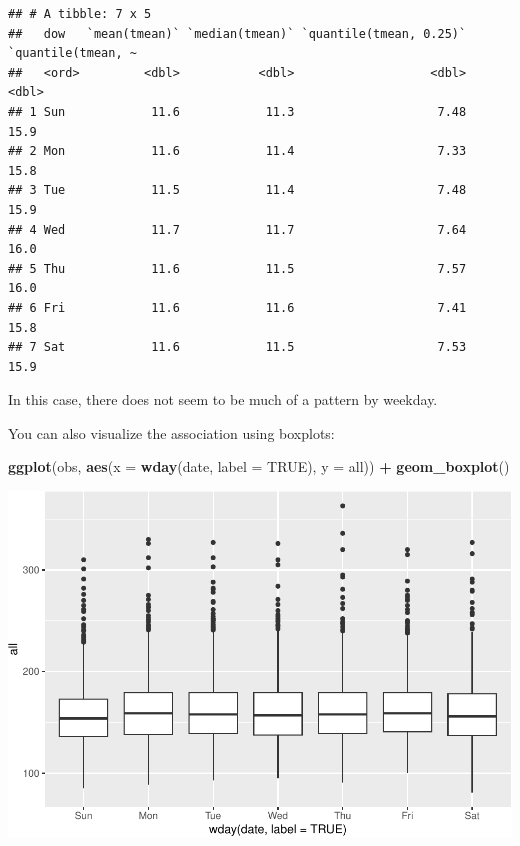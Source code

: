 \documentclass[
]{book}
\newenvironment{Shaded}{\begin{snugshade}}{\end{snugshade}}
\newcommand{\DataTypeTok}[1]{\textcolor[rgb]{0.13,0.29,0.53}{#1}}
\newcommand{\KeywordTok}[1]{\textcolor[rgb]{0.13,0.29,0.53}{\textbf{#1}}}
\newcommand{\NormalTok}[1]{#1}
\newcommand{\OperatorTok}[1]{\textcolor[rgb]{0.81,0.36,0.00}{\textbf{#1}}}
\newcommand{\OtherTok}[1]{\textcolor[rgb]{0.56,0.35,0.01}{#1}}
\newcommand{\StringTok}[1]{\textcolor[rgb]{0.31,0.60,0.02}{#1}}
\begin{document}
\begin{verbatim}
## # A tibble: 7 x 5
##   dow   `mean(tmean)` `median(tmean)` `quantile(tmean, 0.25)` `quantile(tmean, ~
##   <ord>         <dbl>           <dbl>                   <dbl>              <dbl>
## 1 Sun            11.6            11.3                    7.48               15.9
## 2 Mon            11.6            11.4                    7.33               15.8
## 3 Tue            11.5            11.4                    7.48               15.9
## 4 Wed            11.7            11.7                    7.64               16.0
## 5 Thu            11.6            11.5                    7.57               16.0
## 6 Fri            11.6            11.6                    7.41               15.8
## 7 Sat            11.6            11.5                    7.53               15.9
\end{verbatim}

In this case, there does not seem to be much of a pattern by weekday.

You can also visualize the association using boxplots:

\begin{Shaded}
\begin{Highlighting}[]
\KeywordTok{ggplot}\NormalTok{(obs, }\KeywordTok{aes}\NormalTok{(}\DataTypeTok{x =} \KeywordTok{wday}\NormalTok{(date, }\DataTypeTok{label =} \OtherTok{TRUE}\NormalTok{), }\DataTypeTok{y =}\NormalTok{ all)) }\OperatorTok{+}\StringTok{ }
\StringTok{  }\KeywordTok{geom_boxplot}\NormalTok{()}
\end{Highlighting}
\end{Shaded}

\includegraphics{adv_epi_analysis_files/figure-latex/unnamed-chunk-21-1.pdf}
\end{document}

